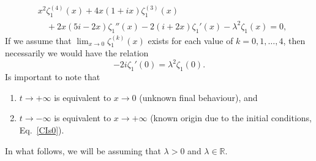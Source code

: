 \documentclass[%
 aip,
 jmp,%
 amsmath,amssymb,
 reprint,%
]{revtex4-2}
\begin{document}
\begin{equation}\label{eq:zeta_1(x)}
\boxed{\begin{aligned}
& x^2\zeta_1^{(4)}(x) + 4x(1+ ix)\zeta_1^{(3)}(x) \\
& \quad + 2x (5i-2x)\zeta_1''(x) - 2(i+2x)\zeta_1'(x) - \lambda^2\zeta_1(x)=0,
\end{aligned}}
\end{equation}
If we assume that $\lim_{x\to 0}\zeta_1^{(k)}(x)$ exists for each value of $k=0,1,\ldots, 4$, then necessarily we would have the relation
\begin{equation}\label{cond_imp}
-2i \zeta_1'(0) = \lambda^2 \zeta_1(0).
\end{equation}
Is important to note that 
\begin{enumerate}
\item[(a)]  $t\to+\infty$ is equivalent to $x\to 0$ (unknown final behaviour), and

\item[(b)]  $t\to-\infty$ is equivalent to $x\to +\infty$ (known origin due to the initial conditions, Eq.~\eqref{CIs0}).
\end{enumerate}
In what follows, we will be assuming that  $\lambda>0$ and $\lambda \in \mathbb{R}$. 

\end{document}
